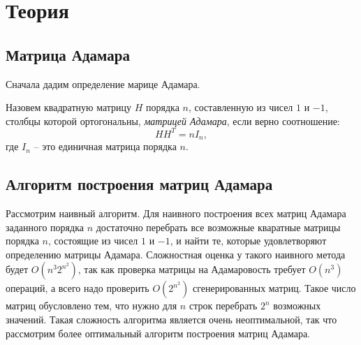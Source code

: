 \setcounter{MaxMatrixCols}{16}

\chapter{Теория}

\section{Матрица Адамара}

Сначала дадим определение марице Адамара.
\begin{Df}\normalfont\label{df:had_m}
    Назовем квадратную матрицу $H$ порядка $n$, составленную из чисел $1$ и $-1$, столбцы которой ортогональны, {\it матрицей Адамара}, если верно соотношение:
    \begin{equation}
        H H^T = n I_n,
    \end{equation}
    где $I_n$ -- это единичная матрица порядка $n$.
\end{Df}

\section{Алгоритм построения матриц Адамара}

Рассмотрим наивный алгоритм. Для наивного построения всех матриц Адамара заданного порядка $n$ достаточно перебрать все возможные кваратные матрицы порядка $n$, состоящие из чисел $1$ и $-1$, и найти те, которые удовлетворяют определению матрицы Адамара. Сложностная оценка у такого наивного метода будет $O(n^3 {2^{n^{2}}})$, так как проверка матрицы на Адамаровость требует $O(n^3)$ операций, а всего надо проверить $O({2^{n^{2}}})$ сгенерированных матриц. Такое число матриц обусловлено тем, что нужно для $n$ строк перебрать $2^n$ возможных значений. Такая сложность алгоритма является очень неоптимальной, так что рассмотрим более оптимальный алгоритм построения матриц Адамара.


